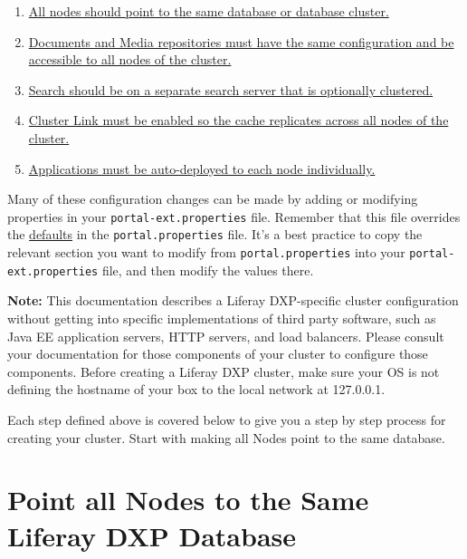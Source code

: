 \begin{enumerate}
\def\labelenumi{\arabic{enumi}.}
\item
  \href{/docs/7-2/deploy/-/knowledge_base/d/point-all-nodes-to-the-same-database}{All
  nodes should point to the same database or database cluster.}
\item
  \href{/docs/7-2/deploy/-/knowledge_base/d/configure-documents-and-media-the-same-for-all-nodes}{Documents
  and Media repositories must have the same configuration and be
  accessible to all nodes of the cluster.}
\item
  \href{/docs/7-2/deploy/-/knowledge_base/d/clustering-search}{Search
  should be on a separate search server that is optionally clustered.}
\item
  \href{/docs/7-2/deploy/-/knowledge_base/d/enabling-cluster-link}{Cluster
  Link must be enabled so the cache replicates across all nodes of the
  cluster.}
\item
  \href{/docs/7-2/deploy/-/knowledge_base/d/auto-deploy-to-all-nodes}{Applications
  must be auto-deployed to each node individually.}
\end{enumerate}

Many of these configuration changes can be made by adding or modifying
properties in your \texttt{portal-ext.properties} file. Remember that
this file overrides the
\href{@platform-ref@/7.2-latest/propertiesdoc/portal.properties.html}{defaults}
in the \texttt{portal.properties} file. It's a best practice to copy the
relevant section you want to modify from \texttt{portal.properties} into
your \texttt{portal-ext.properties} file, and then modify the values
there.

\noindent\hrulefill

\textbf{Note:} This documentation describes a Liferay DXP-specific
cluster configuration without getting into specific implementations of
third party software, such as Java EE application servers, HTTP servers,
and load balancers. Please consult your documentation for those
components of your cluster to configure those components. Before
creating a Liferay DXP cluster, make sure your OS is not defining the
hostname of your box to the local network at 127.0.0.1.

\noindent\hrulefill

Each step defined above is covered below to give you a step by step
process for creating your cluster. Start with making all Nodes point to
the same database.

\chapter{Point all Nodes to the Same Liferay DXP
Database}\label{point-all-nodes-to-the-same-liferay-dxp-database}

